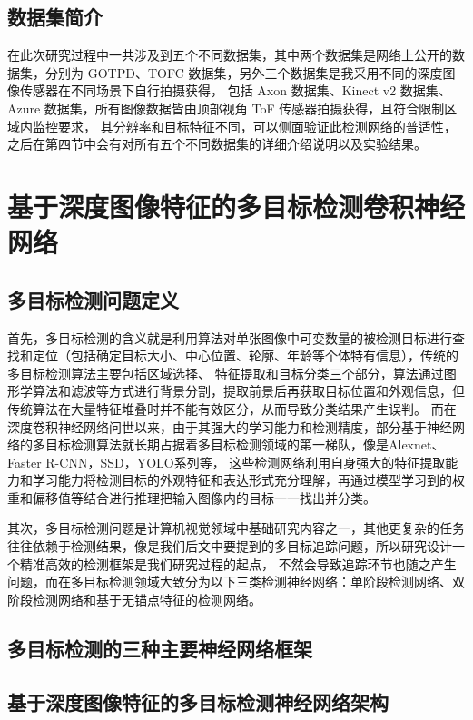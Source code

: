 \subsection{数据集简介}
在此次研究过程中一共涉及到五个不同数据集，其中两个数据集是网络上公开的数据集，分别为 GOTPD、TOFC 数据集，另外三个数据集是我采用不同的深度图像传感器在不同场景下自行拍摄获得，
包括 Axon 数据集、Kinect v2 数据集、Azure 数据集，所有图像数据皆由顶部视角 ToF 传感器拍摄获得，且符合限制区域内监控要求，
其分辨率和目标特征不同，可以侧面验证此检测网络的普适性，之后在第四节中会有对所有五个不同数据集的详细介绍说明以及实验结果。

\section{基于深度图像特征的多目标检测卷积神经网络}
\label{sec2-3}

\subsection{多目标检测问题定义}
首先，多目标检测的含义就是利用算法对单张图像中可变数量的被检测目标进行查找和定位（包括确定目标大小、中心位置、轮廓、年龄等个体特有信息），传统的多目标检测算法主要包括区域选择、
特征提取和目标分类三个部分，算法通过图形学算法和滤波等方式进行背景分割，提取前景后再获取目标位置和外观信息，但传统算法在大量特征堆叠时并不能有效区分，从而导致分类结果产生误判。
而在深度卷积神经网络问世以来，由于其强大的学习能力和检测精度，部分基于神经网络的多目标检测算法就长期占据着多目标检测领域的第一梯队，像是Alexnet、Faster R-CNN，SSD，YOLO系列等，
这些检测网络利用自身强大的特征提取能力和学习能力将检测目标的外观特征和表达形式充分理解，再通过模型学习到的权重和偏移值等结合进行推理把输入图像内的目标一一找出并分类。

其次，多目标检测问题是计算机视觉领域中基础研究内容之一，其他更复杂的任务往往依赖于检测结果，像是我们后文中要提到的多目标追踪问题，所以研究设计一个精准高效的检测框架是我们研究过程的起点，
不然会导致追踪环节也随之产生问题，而在多目标检测领域大致分为以下三类检测神经网络：单阶段检测网络、双阶段检测网络和基于无锚点特征的检测网络。

\subsection{多目标检测的三种主要神经网络框架}


\subsection{基于深度图像特征的多目标检测神经网络架构}



